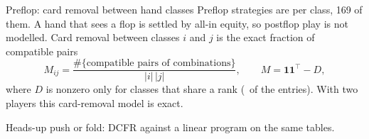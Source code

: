 \documentclass[10pt,aspectratio=169]{beamer}
\begin{document}
\begin{frame}{Preflop: card removal between hand classes}
Preflop strategies are per class, 169 of them. A hand that sees a flop is settled by all-in equity, so postflop play
is not modelled. Card removal between classes $i$ and $j$ is the exact fraction of compatible pairs
\[ M_{ij} = \frac{\#\{\text{compatible pairs of combinations}\}}{|i|\,|j|}, \qquad M = \mathbf 1\mathbf 1^\top - D , \]
where $D$ is nonzero only for classes that share a rank (\DDensity\ of the entries). With two players this card-removal
model is exact.
\pause
\begin{center}
{\footnotesize\setlength\tabcolsep{5pt}}
\end{center}
{\small Heads-up push or fold: DCFR against a linear program on the same tables.}
\end{frame}
\end{document}
